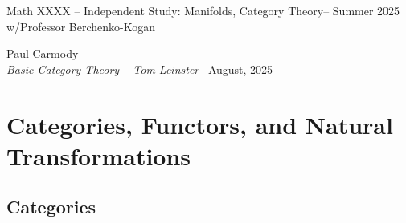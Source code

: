 \documentclass[12pt,a4paper]{report}
\newcommand{\CLASSNAME}{Math XXXX -- Independent Study: Manifolds, Category Theory}
\newcommand{\STUDENTNAME}{Paul Carmody}
\newcommand{\ASSIGNMENT}{\textit{Basic Category Theory -- Tom Leinster}}
\newcommand{\DUEDATE}{August, 2025}
\newcommand{\PROFESSOR}{Professor Berchenko-Kogan}
\newcommand{\SEMESTER}{Summer 2025}
\begin{document}
\begin{center}
	\Large{\CLASSNAME -- \SEMESTER} \\
	\large{ w/\PROFESSOR}
\end{center}
\begin{center}
	\STUDENTNAME \\
	\ASSIGNMENT -- \DUEDATE\\
\end{center} 

\chapter{Categories, Functors, and Natural Transformations}

\section{Categories}
\end{document}
